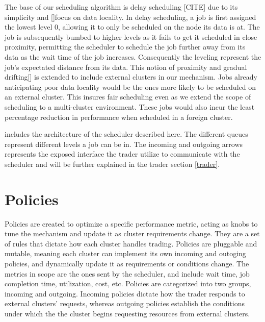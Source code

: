 The base of our scheduling algorithm is delay scheduling [CITE] due to its
simplicity and []focus on data locality. In delay scheduling, a job is first
assigned the lowest level 0, allowing it to only be scheduled on the node its
data is at. The job is subsequently bumbed to higher levels as it fails to get
it scheduled in close proximity, permitting the scheduler to schedule the job
further away from its data as the wait time of the job increases. Consequently
the leveling represent the job's expectated distance from its data. This notion
of proximity and gradual drifting[] is extended to include external clusters in
our mechanism. Jobs already anticipating poor data locality would be the ones
more likely to be scheduled on an external cluster. This insures fair
scheduling even as we extend the scope of scheduling to a multi-cluster
environment. These jobs would also incur the least percentage reduction in
performance when scheduled in a foreign cluster.

 includes the architecture of the scheduler described here. The
different queues represent different levels a job can be in. The incoming and
outgoing arrows represents the exposed interface the trader utilize to
communicate with the scheduler and will be further explained in the trader
section \ref{trader}. 





\section{Policies}

Policies are created to optimize a specific performance metric, acting as knobs
to tune the mechanism and update it as cluster requirements change. They are a
set of rules that dictate how each cluster handles trading. Policies are
pluggable and mutable, meaning each cluster can implement its own incoming and
outoging policies, and dynamically update it as requirements or conditions
change. The metrics in scope are the ones sent by the scheduler, and include
wait time, job completion time, utilization, cost, etc. Policies are
categorized into two groups, incoming and outgoing. Incoming policies dictate
how the trader responds to external clusters' requests, whereas outgoing
policies establish the conditions under which the the cluster begins requesting
resources from external clusters.

